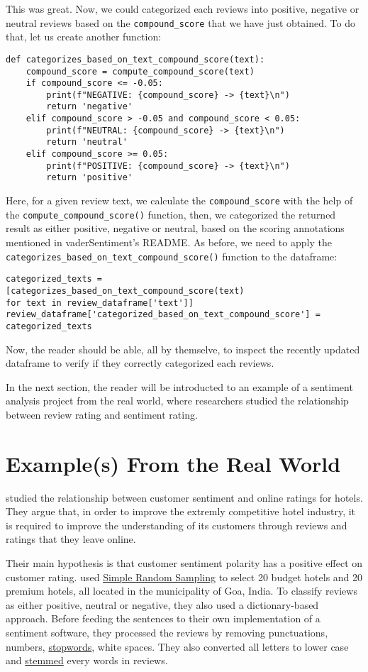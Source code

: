 	This was great. Now, we could categorized each reviews into positive, negative or neutral reviews based on the \verb|compound_score| that we have just obtained. To do that, let us create another function:
	\begin{Verbatim}
def categorizes_based_on_text_compound_score(text):
	compound_score = compute_compound_score(text)
	if compound_score <= -0.05:
		print(f"NEGATIVE: {compound_score} -> {text}\n")
		return 'negative'
	elif compound_score > -0.05 and compound_score < 0.05:
		print(f"NEUTRAL: {compound_score} -> {text}\n")
		return 'neutral'
	elif compound_score >= 0.05:
		print(f"POSITIVE: {compound_score} -> {text}\n")
		return 'positive'
	\end{Verbatim}
	Here, for a given review text, we calculate the \verb|compound_score| with the help of the \verb|compute_compound_score()| function, then, we categorized the returned result as either positive, negative or neutral, based on the scoring annotations mentioned in vaderSentiment's README. As before, we need to apply the \verb|categorizes_based_on_text_compound_score()| function to the dataframe:
	\begin{Verbatim}
categorized_texts =
[categorizes_based_on_text_compound_score(text) 
for text in review_dataframe['text']]
review_dataframe['categorized_based_on_text_compound_score'] = 
categorized_texts
	\end{Verbatim}
	Now, the reader should be able, all by themselve, to inspect the recently updated dataframe to verify if they correctly categorized each reviews.
	
	In the next section, the reader will be introducted to an example of a sentiment analysis project from the real world, where researchers studied the relationship between review rating and sentiment rating.
	
	\section{Example(s) From the Real World}\label{sec:examplerealworld-zidalgo}
	\cite{geetha_relationship_2017} studied the relationship between customer sentiment and online ratings for hotels. They argue that, in order to improve the extremly competitive hotel industry, it is required to improve the understanding of its customers through reviews and ratings that they leave online.
	
	 Their main hypothesis is that customer sentiment polarity has a positive effect on customer rating. \cite{geetha_relationship_2017} used \href{https://en.wikipedia.org/wiki/Simple_random_sample}{Simple Random Sampling} to select 20 budget hotels and 20 premium hotels, all located in the municipality of Goa, India. To classify reviews as either positive, neutral or negative, they also used a dictionary-based approach. Before feeding the sentences to their own implementation of a sentiment software, they processed the reviews by removing punctuations, numbers, \href{https://en.wikipedia.org/wiki/Stop_words}{stopwords}, white spaces. They also converted all letters to lower case and \href{https://en.wikipedia.org/wiki/Stemming}{stemmed} every words in reviews.
	
